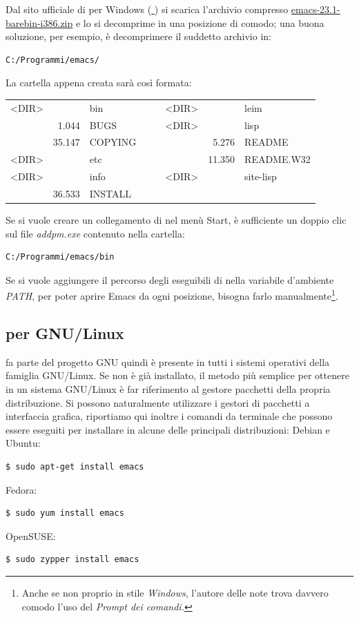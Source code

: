 \documentclass[10pt,a4paper]{article}
\begin{document}
Dal sito ufficiale di \emacs{} per Windows %
(\href{http://ftp.gnu.org/pub/gnu/emacs/windows/}{\mano{} \emacs}) %
si scarica l'archivio compresso %
\href{http://ftp.gnu.org/pub/gnu/emacs/windows/emacs-23.1-barebin-i386.zip}
{\textsf{emacs-23.1-barebin-i386.zip}} e lo si decomprime in una
posizione di comodo; una buona soluzione, per esempio, è decomprimere
il suddetto archivio in:
\begin{Verbatim}
C:/Programmi/emacs/
\end{Verbatim}
La cartella appena creata sarà così formata:
\begin{center}\ttfamily
 \begin{tabular}{lrlcclrl}
  <DIR> &        & bin    & & & <DIR> &        & leim       \\
        & 1.044  & BUGS   & & & <DIR> &        & lisp       \\
        & 35.147 & COPYING& & &       & 5.276  & README     \\
  <DIR> &        & etc    & & &       & 11.350 & README.W32 \\
  <DIR> &        & info   & & & <DIR> &        & site-lisp  \\
        & 36.533 & INSTALL& & &       &        &            \\
 \end{tabular}
\end{center}

Se si vuole creare un collegamento di \emacs{} nel menù Start, è
sufficiente un doppio clic sul file \emph{addpm.exe} contenuto nella cartella:
\begin{Verbatim}
C:/Programmi/emacs/bin
\end{Verbatim}

Se si vuole aggiungere il percorso degli eseguibili di \emacs{} nella
variabile d'ambiente \emph{PATH}, per poter aprire Emacs da ogni
posizione, bisogna farlo manualmente\footnote{Anche se non proprio in
  stile \emph{Windows}, l'autore delle note trova davvero comodo l'uso
del \emph{Prompt dei comandi.}}.

\subsection*{\emacs{} per GNU/Linux}
\label{sec:installlinux}
\emacs{} fa parte del progetto GNU quindi è presente in tutti i sistemi
operativi della famiglia GNU/Linux. Se non è già installato, il metodo più
semplice per ottenere \emacs{} in un sistema GNU/Linux è far riferimento al
gestore pacchetti della propria distribuzione. Si possono naturalmente
utilizzare i gestori di pacchetti a interfaccia grafica, riportiamo qui inoltre
i comandi da terminale che possono essere eseguiti per installare \emacs{} in
alcune delle principali distribuzioni: Debian e Ubuntu:
\begin{Verbatim}
$ sudo apt-get install emacs
\end{Verbatim}
Fedora:
\begin{Verbatim}
$ sudo yum install emacs
\end{Verbatim}
OpenSUSE:
\begin{Verbatim}
$ sudo zypper install emacs
\end{Verbatim}
\end{document}
